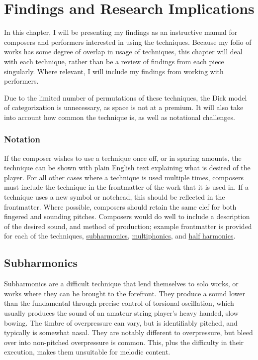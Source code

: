 
\chapter{Findings and Research Implications}\label{ch:chapter4}
In this chapter, I will be presenting my findings as an instructive manual for composers and performers interested in using the techniques.
Because my folio of works has some degree of overlap in usage of techniques, this chapter will deal with each technique, rather than be a review of findings from each piece singularly.
Where relevant, I will include my findings from working with performers.

Due to the limited number of permutations of these techniques, the Dick model of categorization is unnecessary, as space is not at a premium.\autocite{dickOtherFlute1989} 
It will also take into account how common the technique is, as well as notational challenges.

\subsection{Notation}
If the composer wishes to use a technique once off, or in sparing amounts, the technique can be shown with plain English text explaining what is desired of the player.
For all other cases where a technique is used multiple times, composers must include the technique in the frontmatter of the work that it is used in.\autocite[494]{gouldBars2011}
If a technique uses a new symbol or notehead, this should be reflected in the frontmatter.
Where possible, composers should retain the same clef for both fingered and sounding pitches.\autocite[422]{gouldBars2011}
Composers would do well to include a description of the desired sound, and method of production; example frontmatter is provided for each of the techniques, \hyperref[sec:subharmonicFrontmatter]{subharmonics}, \hyperref[sec:multiphonicFrontmatter]{multiphonics}, and \hyperref[sec:halfHarmonicFrontmatter]{half harmonics}. 


\section{Subharmonics}\label{sec:subharmonics}
Subharmonics are a difficult technique that lend themselves to solo works, or works where they can be brought to the forefront.
They produce a sound lower than the fundamental through precise control of torsional oscillation, which usually produces the sound of an amateur string player's heavy handed, slow bowing. 
The timbre of overpressure can vary, but is identifiably pitched, and typically is somewhat nasal.
They are notably different to overpressure, but bleed over into non-pitched overpressure is common.
This, plus the difficulty in their execution, makes them unsuitable for melodic content.

